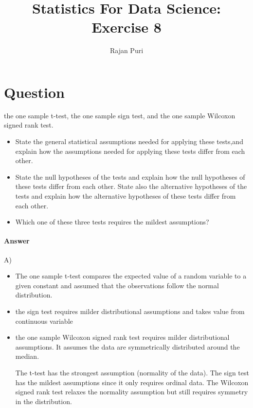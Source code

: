 \documentclass[10pt,letterpaper]{article}
\author{Rajan Puri}
\title{Statistics For Data Science: Exercise 8 }
\begin{document}
\section{Question}
\textbfCompare the one sample t-test, the one sample sign test, and the one sample Wilcoxon signed rank test. \begin{itemize}
    \item State the general statistical assumptions needed for applying these tests,and explain how the assumptions needed for applying these tests differ from each other.
    \item State the null hypotheses of the tests and explain how the null hypotheses of these tests differ from each other. State also the alternative hypotheses of the tests and explain how the alternative hypotheses of these tests differ from each other.

    \item Which one of these three tests requires the mildest assumptions?
\end{itemize}


\paragraph{Answer}
A) \begin{itemize}
    \item The one sample t-test compares the expected value of a random variable
to a given constant and assumed that the observations follow the normal distribution.
\item the sign test requires milder distributional assumptions and takes value from continuous variable
\item the one sample Wilcoxon signed rank test requires milder distributional assumptions. It assumes the data are symmetrically distributed around the median.

The t-test has the strongest assumption (normality of the data).
The sign test has the mildest assumptions since it only requires ordinal data.
The Wilcoxon signed rank test relaxes the normality assumption but still requires symmetry in the distribution.
\end{itemize} 
\end{document}
